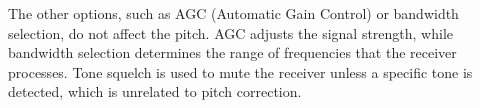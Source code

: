 The other options, such as AGC (Automatic Gain Control) or bandwidth selection, do not affect the pitch. AGC adjusts the signal strength, while bandwidth selection determines the range of frequencies that the receiver processes. Tone squelch is used to mute the receiver unless a specific tone is detected, which is unrelated to pitch correction.

